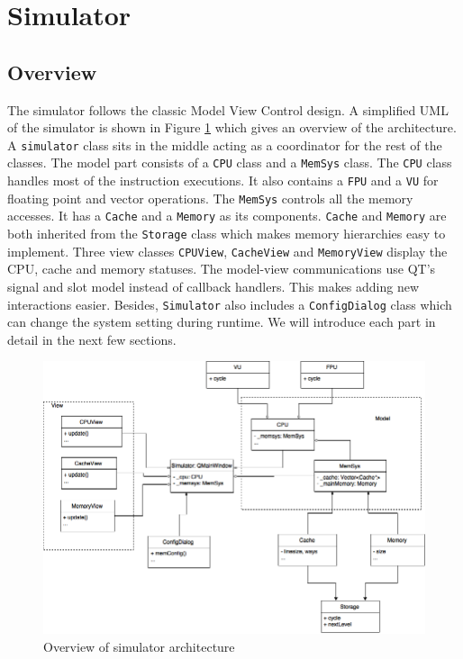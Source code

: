 \documentclass{sig-alternate}
\begin{document}
\section{Simulator}
\subsection{Overview}
The simulator follows the classic Model View Control design. A simplified UML of the simulator is shown in Figure \ref{fig:uml} which gives an overview of the architecture. A \texttt{simulator} class sits in the middle acting as a coordinator for the rest of the classes. The model part consists of a \texttt{CPU} class and a \texttt{MemSys} class. The \texttt{CPU} class handles most of the instruction executions. It also contains a \texttt{FPU} and a \texttt{VU} for floating point and vector operations. The \texttt{MemSys} controls all the memory accesses. It has a \texttt{Cache} and a \texttt{Memory} as its components. \texttt{Cache} and \texttt{Memory} are both inherited from the \texttt{Storage} class which makes memory hierarchies easy to implement. Three view classes \texttt{CPUView}, \texttt{CacheView} and \texttt{MemoryView} display the CPU, cache and memory statuses. The model-view communications use QT's signal and slot model instead of callback handlers. This makes adding new interactions easier. Besides, \texttt{Simulator} also includes a \texttt{ConfigDialog} class which can change the system setting during runtime. We will introduce each part in detail in the next few sections. 

\begin{figure}[!ht]
\centering
\includegraphics[width = 0.7\linewidth,keepaspectratio]{uml_simulator}
\caption{Overview of simulator architecture}
\label{fig:uml}
\end{figure}
\end{document}
